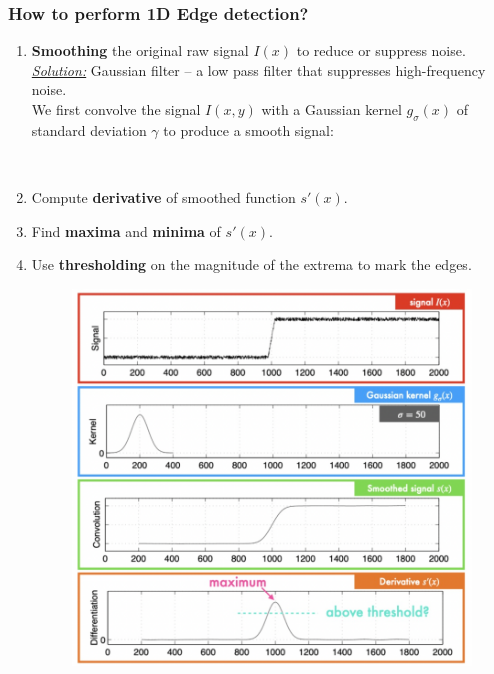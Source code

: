 \documentclass[a4paper,11pt]{article}
\begin{document}
\subsubsection{How to perform 1D Edge detection?}
\begin{enumerate}
	\item \textbf{Smoothing} the original raw signal $I(x)$ to reduce or suppress noise. \\
	\underline{\textit{Solution:}} Gaussian filter -- a low pass filter that suppresses high-frequency noise.\\
	We first convolve the signal $I(x,y)$ with a Gaussian kernel $g_\sigma (x)$ of standard deviation $\gamma$ to produce a smooth signal:
	\begin{center}
		\vspace{5pt}\\
	\end{center}
	\item Compute \textbf{derivative} of smoothed function $s'(x)$.
	\item Find \textbf{maxima} and \textbf{minima} of $s'(x)$.
	\item Use \textbf{thresholding} on the magnitude of the extrema to mark the edges.
	\begin{figure}[h]
		\centering
		\includegraphics[width=0.8\linewidth]{figures/1Dedge.png}
	\end{figure}
\end{enumerate}
\end{document}
